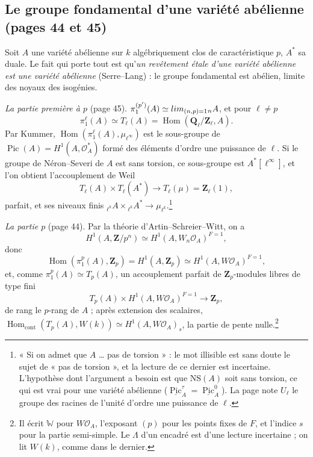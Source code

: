 \documentclass[11pt,a4paper]{article}
\begin{document}
\subsection*{Le groupe fondamental d'une variété abélienne (pages 44 et 45)}

Soit $A$ une variété abélienne sur $k$ algébriquement clos de caractéristique
$p$, $A^*$ sa duale. Le fait qui porte tout est qu'\emph{un revêtement étale
d'une variété abélienne est une variété abélienne} (Serre--Lang) : le groupe
fondamental est abélien, limite des noyaux des isogénies.

\emph{La partie première à $p$} (page 45). $\pi_1^{(p')}(A) \simeq
\varprojlim_{(n,p)=1} {}_nA$, et pour $\ell \neq p$
\[ \pi_1^{\ell}(A) \simeq T_\ell(A) = \operatorname{Hom}(\mathbf{Q}_\ell/
\mathbf{Z}_\ell, A). \]
Par Kummer, $\operatorname{Hom}(\pi_1^\ell(A), \mu_{\ell^\infty})$ est le
sous-groupe de $\operatorname{Pic}(A) = H^1(A, \mathcal{O}_A^*)$ formé des
éléments d'ordre une puissance de $\ell$. Si le groupe de Néron--Severi de $A$ est
sans torsion, ce sous-groupe est $A^*[\ell^\infty]$, et l'on obtient
l'accouplement de Weil
\[ \boxed{T_\ell(A) \times T_\ell(A^*) \longrightarrow T_\ell(\mu) =
\mathbf{Z}_\ell(1)} , \]
parfait, et ses niveaux finis ${}_{\ell^k}A \times {}_{\ell^k}A^* \to
\mu_{\ell^k}$.\footnote{« Si on admet que $A$ \ldots{} pas de torsion » : le mot
illisible est sans doute le sujet de « pas de torsion », et la lecture de ce
dernier est incertaine. L'hypothèse dont l'argument a besoin est que
$\mathrm{NS}(A)$ soit sans torsion, ce qui est vrai pour une variété abélienne
($\underline{\operatorname{Pic}}^\tau_A = \underline{\operatorname{Pic}}^0_A$).
La page note $U_\ell$ le groupe des racines de l'unité d'ordre une puissance de
$\ell$.}

\emph{La partie $p$} (page 44). Par la théorie d'Artin--Schreier--Witt, on a
\[ H^1(A, \mathbf{Z}/p^n) \simeq H^1(A, W_n\mathcal{O}_A)^{F=1} , \]
donc
\[ \operatorname{Hom}(\pi_1^p(A), \mathbf{Z}_p) = H^1(A, \mathbf{Z}_p) \simeq
H^1(A, W\mathcal{O}_A)^{F=1} , \]
et, comme $\pi_1^p(A) \simeq T_p(A)$, un accouplement parfait de
$\mathbf{Z}_p$-modules libres de type fini
\[ \boxed{T_p(A) \times H^1(A, W\mathcal{O}_A)^{F=1} \longrightarrow
\mathbf{Z}_p} , \]
de rang le $p$-rang de $A$ ; après extension des scalaires,
$\operatorname{Hom}_{\mathrm{cont}}(T_p(A), W(k)) \simeq H^1(A,
W\mathcal{O}_A)_s$, la partie de pente nulle.\footnote{Il écrit
$\mathbb{W}$ pour $W\mathcal{O}_A$, l'exposant $(p)$ pour les points fixes de $F$,
et l'indice $s$ pour la partie semi-simple. Le $\Lambda$ d'un encadré est d'une
lecture incertaine ; on lit $W(k)$, comme dans le dernier.}
\end{document}
